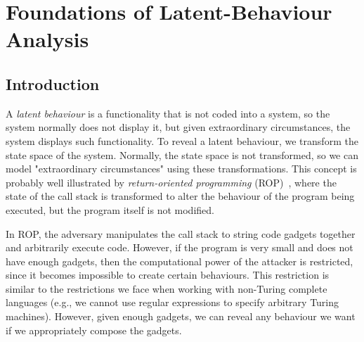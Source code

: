 

\chapter{Foundations of Latent-Behaviour Analysis} %
\label{ch:LatentBehaviours} %

\section{Introduction}

A \emph{latent behaviour} is a functionality that is not coded into a system, so the system normally does not display it, but given extraordinary circumstances, the system displays such functionality. To reveal a latent behaviour, we transform the state space of the system. Normally, the state space is not transformed, so we can model "extraordinary circumstances" using these transformations. This concept is probably well illustrated by \emph{return-oriented programming} (ROP)~\cite{ROP}, where the state of the call stack is transformed to alter the behaviour of the program being executed, but the program itself is not modified.

In ROP, the adversary manipulates the call stack to string code gadgets together and arbitrarily execute code. However, if the program is very small and does not have enough gadgets, then the computational power of the attacker is restricted, since it becomes impossible to create certain behaviours. This restriction is similar to the restrictions we face when working with non-Turing complete languages (e.g., we cannot use regular expressions to specify arbitrary Turing machines). However, given enough gadgets, we can reveal any behaviour we want if we appropriately compose the gadgets.

